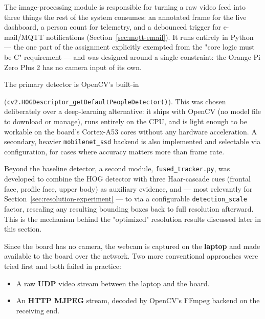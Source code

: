 \label{sec:image-processing}


The image-processing module is responsible for turning a raw video feed
into three things the rest of the system consumes: an annotated frame for
the live dashboard, a person count for telemetry, and a debounced trigger
for e-mail/MQTT notifications (Section~\ref{sec:mqtt-email}). It runs
entirely in Python — the one part of the assignment explicitly exempted
from the "core logic must be C" requirement — and was designed around a
single constraint: the Orange Pi Zero Plus 2 has no camera input of its
own.


The primary detector is OpenCV's built-in  

(\texttt{cv2.HOGDescriptor\_getDefaultPeopleDetector()}). This
was chosen deliberately over a deep-learning alternative: it ships with
OpenCV (no model file to download or manage), runs entirely on the CPU,
and is light enough to be workable on the board's Cortex-A53 cores without
any hardware acceleration. A secondary, heavier \texttt{mobilenet\_ssd}
backend is also implemented and selectable via configuration, for cases
where accuracy matters more than frame rate.

Beyond the baseline detector, a second module, \texttt{fused\_tracker.py},
was developed to combine the HOG detector with three Haar-cascade cues
(frontal face, profile face, upper body) as auxiliary evidence, and — most
relevantly for Section~\ref{sec:resolution-experiment} — to
 via a configurable
\texttt{detection\_scale} factor, rescaling any resulting bounding boxes
back to full resolution afterward. This is the mechanism behind the
"optimized" resolution results discussed later in this section.


Since the board has no camera, the webcam is captured on the
\textbf{laptop} and made available to the board over the network. Two more
conventional approaches were tried first and both failed in practice:

\begin{itemize}
    \item A raw \textbf{UDP} video stream between the laptop and the
    board.
    \item An \textbf{HTTP MJPEG} stream, decoded by OpenCV's FFmpeg
    backend on the receiving end.
\end{itemize}

